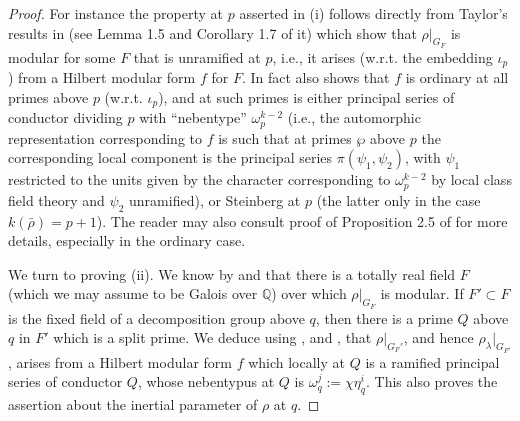\documentclass[12pt]{amsart}
\newcommand{\Q}{\mathbb{Q}}
\newcommand{\rhobar}{\overline{\rho}}
\def\rhobar{ {\bar {\rho} } }
\begin{document}
\begin{proof}
For instance the property at $p$ asserted in (i) follows directly from
Taylor's results in \cite{Tay1} (see Lemma 1.5 and Corollary 1.7 of it) which show that $\rho|_{G_F}$ is modular for some $F$ that is unramified at $p$, i.e., it arises (w.r.t.
the embedding $\iota_p$) from a  Hilbert modular form $f$ for $F$.
In fact \cite{Tay1} also shows that $f$ is ordinary at all primes above $p$ (w.r.t. $\iota_p$), and at such primes 
is either principal series of conductor dividing $p$ with ``nebentype'' $\omega_p^{k-2}$ (i.e.,
the automorphic representation corresponding to $f$ is such that at primes $\wp$ above $p$ the corresponding
local component is the principal series $\pi(\psi_1,\psi_2)$, with $\psi_1$ restricted to the units given by the character  corresponding to  $\omega_p^{k-2}$ by local class field theory and $\psi_2$ unramified), or Steinberg at $p$ (the latter only in the case $k(\rhobar)=p+1$). The reader may also consult proof of Proposition 2.5 of \cite{KW} for more details, especially in the ordinary case.

We turn to proving (ii).
We know by \cite{Tay1} and \cite{Tay2} that there is a totally real field $F$
(which we may assume to be Galois over $\Q$) 
over which $\rho|_{G_F}$ is modular. 
If $F'\subset F$ is the fixed field of a  decomposition group above $q$, then there is a prime $Q$ above $q$ in $F'$ which is a split prime. We deduce  using \cite{AC}, \cite{Carayol} and \cite{Tay}, 
that $\rho|_{G_F'}$, and hence 
$\rho_\lambda|_{G_{F'}}$,  arises from a Hilbert modular form $f$ which locally at 
$Q$ is a ramified principal series of conductor $Q$, whose nebentypus at $Q$ is $\omega_q^j:=\chi\eta_q^i$. This also proves the assertion about the inertial parameter of $\rho$ at $q$.


\end{proof}
\end{document}
